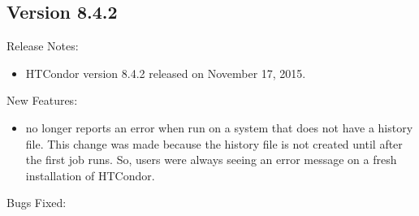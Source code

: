\subsection*{\label{sec:New-8-4-2}Version 8.4.2}

\noindent Release Notes:

\begin{itemize}

\item HTCondor version 8.4.2 released on November 17, 2015.

\end{itemize}


\noindent New Features:

\begin{itemize}

\item {} no longer reports an error when run on a system that does
not have a history file.
This change was made because the history file is not created until after the
first job runs.
So, users were always seeing an error message on a fresh installation of
HTCondor.

\end{itemize}

\noindent Bugs Fixed:

